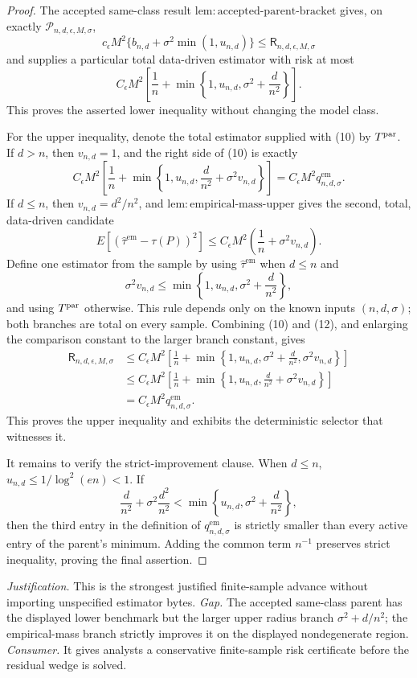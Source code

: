 \documentclass{article}
\begin{document}
\begin{proof}
The accepted same-class result \(\mathrm{lem:accepted\text{-}parent\text{-}bracket}\) gives, on exactly \(\mathcal P_{n,d,\epsilon,M,\sigma}\),
\[
 c_{\epsilon}M^2\{b_{n,d}+\sigma^2\min(1,u_{n,d})\}
 \leq\mathsf R_{n,d,\epsilon,M,\sigma}
\]
and supplies a particular total data-driven estimator with risk at most
\[
 C_{\epsilon}M^2\left[\frac1n+
 \min\left\{1,u_{n,d},\sigma^2+\frac d{n^2}\right\}\right]. \tag{10}
\]
This proves the asserted lower inequality without changing the model class.

For the upper inequality, denote the total estimator supplied with (10) by \(T^{\rm par}\).  If \(d>n\), then \(v_{n,d}=1\), and the right side of (10) is exactly
\[
 C_{\epsilon}M^2\left[\frac1n+
 \min\left\{1,u_{n,d},\frac d{n^2}+\sigma^2v_{n,d}\right\}\right]
 =C_{\epsilon}M^2q_{n,d,\sigma}^{\mathrm{em}}. \tag{11}
\]
If \(d\leq n\), then \(v_{n,d}=d^2/n^2\), and \(\mathrm{lem:empirical\text{-}mass\text{-}upper}\) gives the second, total, data-driven candidate
\[
 E[(\widehat\tau^{\mathrm{em}}-\tau(P))^2]
 \leq C_{\epsilon}M^2\left(\frac1n+\sigma^2v_{n,d}\right). \tag{12}
\]
Define one estimator from the sample by using \(\widehat\tau^{\mathrm{em}}\) when \(d\leq n\) and
\[
 \sigma^2v_{n,d}
 \leq\min\left\{1,u_{n,d},\sigma^2+\frac d{n^2}\right\},
\]
and using \(T^{\rm par}\) otherwise.  This rule depends only on the known inputs \((n,d,\sigma)\); both branches are total on every sample.  Combining (10) and (12), and enlarging the comparison constant to the larger branch constant, gives
\[
 \begin{aligned}
 \mathsf R_{n,d,\epsilon,M,\sigma}
 &\leq C_{\epsilon}M^2\left[\frac1n+
 \min\left\{1,u_{n,d},\sigma^2+\frac d{n^2},\sigma^2v_{n,d}\right\}\right]\\
 &\leq C_{\epsilon}M^2\left[\frac1n+
 \min\left\{1,u_{n,d},\frac d{n^2}+\sigma^2v_{n,d}\right\}\right]\\
 &=C_{\epsilon}M^2q_{n,d,\sigma}^{\mathrm{em}}.
 \end{aligned}
\]
This proves the upper inequality and exhibits the deterministic selector that witnesses it.

It remains to verify the strict-improvement clause.  When \(d\leq n\),
\(
 u_{n,d}\leq1/\log^2(en)<1
\).
If
\[
 \frac d{n^2}+\sigma^2\frac{d^2}{n^2}
 <\min\left\{u_{n,d},\sigma^2+\frac d{n^2}\right\},
\]
then the third entry in the definition of \(q_{n,d,\sigma}^{\mathrm{em}}\) is strictly smaller than every active entry of the parent's minimum.  Adding the common term \(n^{-1}\) preserves strict inequality, proving the final assertion.
\end{proof}
\par\smallskip\noindent \textit{Justification.} This is the strongest justified finite-sample advance without importing unspecified estimator bytes. \textit{Gap.} The accepted same-class parent has the displayed lower benchmark but the larger upper radius branch \(\sigma^2+d/n^2\); the empirical-mass branch strictly improves it on the displayed nondegenerate region. \textit{Consumer.} It gives analysts a conservative finite-sample risk certificate before the residual wedge is solved.
\end{document}
